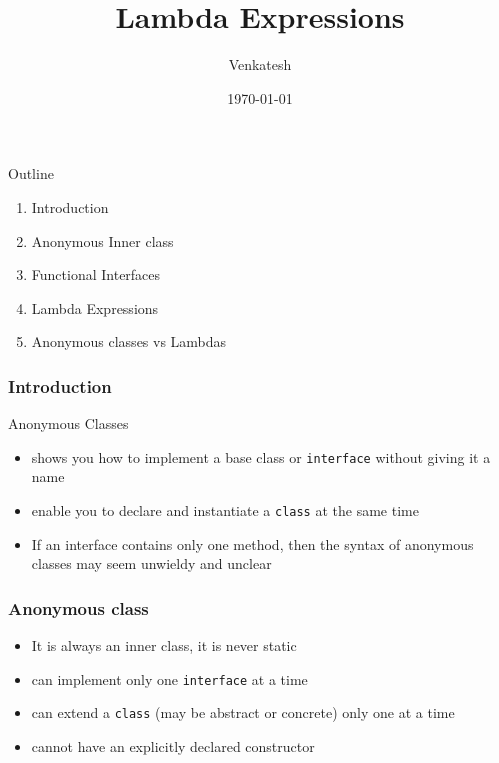 \documentclass{beamer}
\title{Lambda Expressions} %
\author{Venkatesh} %
\institute{WDC}
\date{\today} %
\begin{document}
\lstset{
    basicstyle=\ttfamily\footnotesize,
    breaklines=true
    breakatwhitespace=true,
    language=C++,
    columns=fullflexible,
    keepspaces=true,
    breaklines=true,
    tabsize=3, 
    showstringspaces=false,
    extendedchars=true
    inputencoding=utf8
}

\begin{frame}
\titlepage %
\end{frame}

\begin{frame}{Outline}

  \begin{enumerate}

   \item Introduction
   \item Anonymous Inner class
   \item Functional Interfaces
   \item Lambda Expressions
   \item Anonymous classes vs Lambdas
   
  \end{enumerate}
\end{frame}




\begin{frame}[fragile]
\frametitle{Introduction}

Anonymous Classes
\begin{itemize}
  \item <1-> shows you how to implement a base class or \texttt{interface} without giving it a name
  \item <2-> enable you to declare and instantiate a \texttt{class} at the same time
  \item <3-> If an interface contains only one method, then the syntax of anonymous classes may seem unwieldy and unclear
\end{itemize}

\end{frame}


\begin{frame}[fragile]
\frametitle{Anonymous class}

\begin{itemize}
\item <1-> It is always an inner class, it is never static
\item <2-> can implement only one \texttt{interface} at a time
\item <3-> can extend a \texttt{class} (may be abstract or concrete) only one at a time
\item <4-> cannot have an explicitly declared constructor
\end{itemize}

\end{frame}
\end{document}
